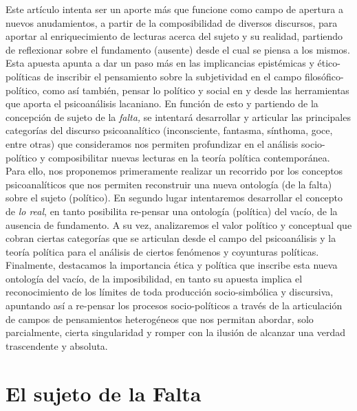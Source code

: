 Este artículo intenta ser un aporte más que funcione como campo de
apertura a nuevos anudamientos, a partir de la composibilidad de
diversos discursos, para aportar al enriquecimiento de lecturas acerca
del sujeto y su realidad, partiendo de reflexionar sobre el fundamento
(ausente) desde el cual se piensa a los mismos. Esta apuesta apunta a
dar un paso más en las implicancias epistémicas y ético-políticas de
inscribir el pensamiento sobre la subjetividad en el campo
filosófico-político, como así también, pensar lo político y social en y
desde las herramientas que aporta el psicoanálisis lacaniano. En función
de esto y partiendo de la concepción de sujeto de la \emph{falta,} se
intentará desarrollar y articular las principales categorías del
discurso psicoanalítico (inconsciente, fantasma, sínthoma, goce, entre
otras) que consideramos nos permiten profundizar en el análisis
socio-político y composibilitar nuevas lecturas en la teoría política
contemporánea. Para ello, nos proponemos primeramente realizar un
recorrido por los conceptos psicoanalíticos que nos permiten reconstruir
una nueva ontología (de la falta) sobre el sujeto (político). En segundo
lugar intentaremos desarrollar el concepto de \emph{lo real}, en tanto
posibilita re-pensar una ontología (política) del vacío, de la ausencia
de fundamento. A su vez, analizaremos el valor político y conceptual que
cobran ciertas categorías que se articulan desde el campo del
psicoanálisis y la teoría política para el análisis de ciertos fenómenos
y coyunturas políticas. Finalmente, destacamos la importancia ética y
política que inscribe esta nueva ontología del vacío, de la
imposibilidad, en tanto su apuesta implica el reconocimiento de los
límites de toda producción socio-simbólica y discursiva, apuntando así a
re-pensar los procesos socio-políticos a través de la articulación de
campos de pensamientos heterogéneos que nos permitan abordar, solo
parcialmente, cierta singularidad y romper con la ilusión de alcanzar
una verdad trascendente y absoluta.

\section{El sujeto de la Falta}

